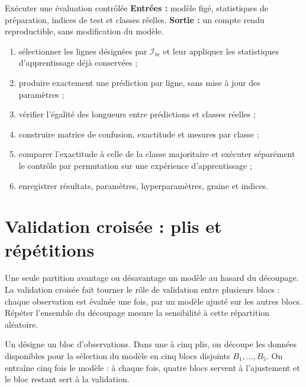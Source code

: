 \begin{procedure}{Exécuter une évaluation contrôlée}
\textbf{Entrées :} modèle figé, statistiques de préparation, indices de test et
classes réelles. \textbf{Sortie :} un compte rendu reproductible, sans
modification du modèle.
\begin{enumerate}
  \item sélectionner les lignes désignées par $\mathcal I_{\mathrm{te}}$ et leur
        appliquer les statistiques d'apprentissage déjà conservées ;
  \item produire exactement une prédiction par ligne, sans mise à jour des paramètres ;
  \item vérifier l'égalité des longueurs entre prédictions et classes réelles ;
  \item construire matrice de confusion, exactitude et mesures par classe ;
  \item comparer l'exactitude à celle de la classe majoritaire et exécuter
        séparément le contrôle par permutation sur une expérience d'apprentissage ;
  \item enregistrer résultats, paramètres, hyperparamètres, graine et indices.
\end{enumerate}
\end{procedure}

\section{Validation croisée : plis et répétitions}

\begin{lecture}
Une seule partition avantage ou désavantage un modèle au hasard du découpage. La
validation croisée fait tourner le rôle de validation entre plusieurs blocs :
chaque observation est évaluée une fois, par un modèle ajusté sur les autres
blocs. Répéter l'ensemble du découpage mesure la sensibilité à cette répartition
aléatoire.
\end{lecture}

Un  désigne un bloc d'observations. Dans une 
à cinq plis, on découpe les données disponibles pour la sélection du modèle en
cinq blocs disjoints $B_1,\ldots,B_5$. On entraîne cinq fois le modèle : à chaque
fois, quatre blocs servent à l'ajustement et le bloc restant sert à la validation.

